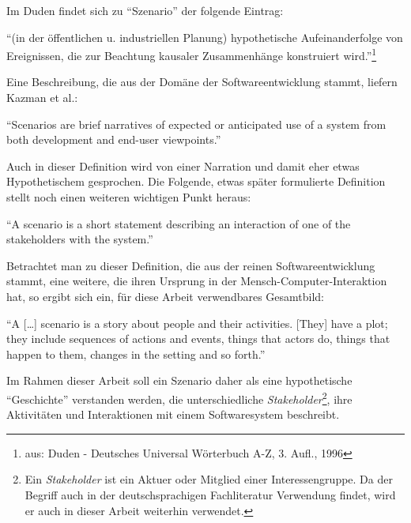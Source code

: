   Im Duden findet sich zu "`Szenario"' der folgende Eintrag:
  
  \begin{definition}\label{def:szenario_allg}
    "`(in der öffentlichen u. industriellen Planung) hypothetische Aufeinanderfolge von Ereignissen, die zur Beachtung kausaler Zusammenhänge konstruiert wird."'\footnote{aus: Duden - Deutsches Universal Wörterbuch A-Z, 3. Aufl., 1996}
  \end{definition}
  
  Eine Beschreibung, die aus der Domäne der Softwareentwicklung stammt, liefern Kazman et al.:
  
  \begin{definition}\label{def:szenario_kazman_et_al}
    "`Scenarios are brief narratives of expected or anticipated use of a system from both development and end-user viewpoints."'~\emph{\citep[S. 2]{scenario_based_analysis_of_software_architecture}}
  \end{definition}
  
  Auch in dieser Definition wird von einer Narration und damit eher etwas Hypothetischem gesprochen. Die Folgende, etwas später formulierte Definition stellt noch einen weiteren wichtigen Punkt heraus:
  
  \begin{definition}\label{def:szenario_clements_et_al}
    "`A scenario is a short statement describing an interaction of one of the stakeholders with the system."'~\emph{\citep[S. 33]{evaluating_software_architectures}}
  \end{definition}
  
  Betrachtet man zu dieser Definition, die aus der reinen Softwareentwicklung stammt, eine weitere, die ihren Ursprung in der Mensch-Computer-Interaktion hat, so ergibt sich ein, für diese Arbeit verwendbares Gesamtbild:
  
  \begin{definition}\label{def:szenario_carroll_rosson}
    "`A [\ldots] scenario is a story about people and their activities. [They] have a plot; they include sequences of actions and events, things that actors do, things that happen to them, changes in the setting and so forth."'~\emph{\citep[S. 16/18]{scenario_based_development}}
  \end{definition}
  
  Im Rahmen dieser Arbeit soll ein Szenario daher als eine hypothetische "`Geschichte"' verstanden werden, die unterschiedliche \emph{Stakeholder}\footnote{Ein \emph{Stakeholder} ist ein Aktuer oder Mitglied einer Interessengruppe. Da der Begriff auch in der deutschsprachigen Fachliteratur Verwendung findet, wird er auch in dieser Arbeit weiterhin verwendet.}, ihre Aktivitäten und Interaktionen mit einem Softwaresystem beschreibt.
  
